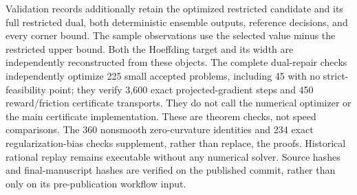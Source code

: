 \documentclass[11pt,letterpaper]{article}
\theoremstyle{definition}
\newcommand{\1}{\mathbf 1}
\begin{document}
Validation records additionally retain the optimized restricted candidate and its full restricted dual, both deterministic ensemble outputs, reference decisions, and every corner bound. The sample observations use the selected value minus the restricted upper bound. Both the Hoeffding target and its width are independently reconstructed from these objects. The complete dual-repair checks independently optimize 225 small accepted problems, including 45 with no strict-feasibility point; they verify 3,600 exact projected-gradient steps and 450 reward/friction certificate transports. They do not call the numerical optimizer or the main certificate implementation. These are theorem checks, not speed comparisons. The 360 nonsmooth zero-curvature identities and 234 exact regularization-bias checks supplement, rather than replace, the proofs. Historical rational replay remains executable without any numerical solver. Source hashes and final-manuscript hashes are verified on the published commit, rather than only on its pre-publication workflow input.
\end{document}
